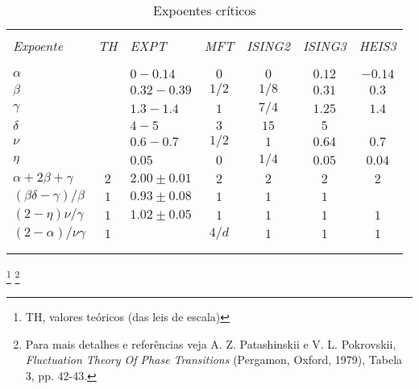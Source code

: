 \begin{table}[h]
\renewcommand{\tablename}{{\bf Tabela}}
\caption{Expoentes críticos}
\begin{center}
\vspace{0.2cm}
\begin{tabular}{l c l c c c c}
\hline
\\[-0.3cm]
{\it Expoente} & {\it  TH}  & {\it EXPT} & {\it MFT} & {\it ISING2} & {\it ISING3} & {\it HEIS3}\\
\\[-0.4cm]
\hline
\\[-0.3cm]
$\alpha$                      &     & $0-0.14$      & $0$   & $0$   & $0.12$ & $-0.14$ \\
$\beta$                       &     & $0.32-0.39$   & $1/2$ & $1/8$ & $0.31$ & $0.3$   \\
$\gamma$                      &     & $1.3-1.4$     & $1$   & $7/4$ & $1.25$ & $1.4$   \\
$\delta$                      &     & $4-5$         & $3$   & $15$  & $5$    &         \\
$\nu$                         &     & $0.6-0.7$     & $1/2$ & $1$   & $0.64$ & $0.7$   \\
$\eta$                        &     & $0.05$        & $0$   & $1/4$ & $0.05$ & $0.04$  \\
$\alpha+2\beta+\gamma$        & $2$ & $2.00\pm0.01$ & $2$   & $2$   & $2$    & $2$     \\
$(\beta \delta-\gamma)/\beta$ & $1$ & $0.93\pm0.08$ & $1$   & $1$   & $1$    &         \\
$(2-\eta)\nu/\gamma$          & $1$ & $1.02\pm0.05$ & $1$   & $1$   & $1$    & $1$     \\
$(2-\alpha)/\nu \gamma$       & $1$ &               & $4/d$ & $1$   & $1$    & $1$     \\
\\[-0.3cm]
\hline\\
\end{tabular}
\end{center}
\label{expoentes_criticos}
\end{table}

\footnote{TH, valores teóricos (das leis de escala)}
\footnote{Para mais detalhes e referências veja A. Z. Patashinskii e V. L. Pokrovskii, {\it Fluctuation Theory Of Phase Transitions} (Pergamon, Oxford, 1979), Tabela 3, pp. 42-43.}

